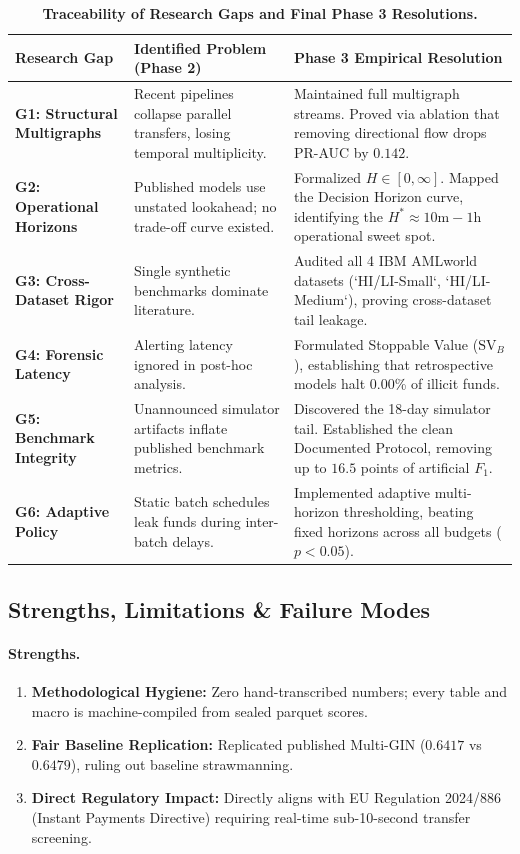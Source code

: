\documentclass[11pt,a4paper]{article}
\begin{document}
\begin{table}[ht]
\centering
\small
\caption{\textbf{Traceability of Research Gaps and Final Phase 3 Resolutions.}}
\label{tab:research_gaps_resolution}
\begin{tabularx}{\textwidth}{L{2.2cm}L{3.5cm}X}
\toprule
\textbf{Research Gap} & \textbf{Identified Problem (Phase 2)} & \textbf{Phase 3 Empirical Resolution} \\
\midrule
\textbf{G1: Structural Multigraphs} & Recent pipelines collapse parallel transfers, losing temporal multiplicity. & Maintained full multigraph streams. Proved via ablation that removing directional flow drops PR-AUC by $0.142$. \\
\textbf{G2: Operational Horizons} & Published models use unstated lookahead; no trade-off curve existed. & Formalized $H \in [0, \infty]$. Mapped the Decision Horizon curve, identifying the $H^* \approx 10\text{m} - 1\text{h}$ operational sweet spot. \\
\textbf{G3: Cross-Dataset Rigor} & Single synthetic benchmarks dominate literature. & Audited all 4 IBM AMLworld datasets (`HI/LI-Small`, `HI/LI-Medium`), proving cross-dataset tail leakage. \\
\textbf{G4: Forensic Latency} & Alerting latency ignored in post-hoc analysis. & Formulated Stoppable Value ($\text{SV}_B$), establishing that retrospective models halt 0.00\% of illicit funds. \\
\textbf{G5: Benchmark Integrity} & Unannounced simulator artifacts inflate published benchmark metrics. & Discovered the 18-day simulator tail. Established the clean Documented Protocol, removing up to $16.5$ points of artificial $F_1$. \\
\textbf{G6: Adaptive Policy} & Static batch schedules leak funds during inter-batch delays. & Implemented adaptive multi-horizon thresholding, beating fixed horizons across all budgets ($p < 0.05$). \\
\bottomrule
\end{tabularx}
\end{table}

\subsection{Strengths, Limitations \& Failure Modes}
\paragraph{Strengths.}
\begin{enumerate}[leftmargin=*]
    \item \textbf{Methodological Hygiene:} Zero hand-transcribed numbers; every table and macro is machine-compiled from sealed parquet scores.
    \item \textbf{Fair Baseline Replication:} Replicated published Multi-GIN ($0.6417$ vs $0.6479$), ruling out baseline strawmanning.
    \item \textbf{Direct Regulatory Impact:} Directly aligns with EU Regulation 2024/886 (Instant Payments Directive) requiring real-time sub-10-second transfer screening.
\end{enumerate}
\end{document}

